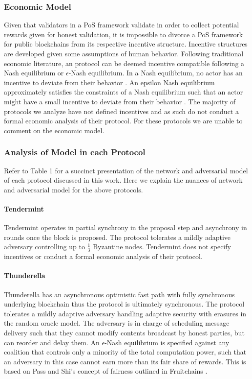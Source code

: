\documentclass[10pt,journal,compsoc]{IEEEtran}
\begin{document}
\subsubsection{Economic Model}
Given that validators in a PoS framework validate in order to collect potential rewards given for honest validation, it is impossible to divorce a PoS framework for public blockchains from its respective incentive structure. Incentive structures are developed given some assumptions of human behavior. Following traditional economic literature, an protocol can be deemed incentive compatible following a Nash equilibrium or $\epsilon$-Nash equilibrium. In a Nash equilibrium, no actor has an incentive to deviate from their behavior \cite{AlgoGT}. An epsilon Nash equilibrium approximately satisfies the constraints of a Nash equilibrium such that an actor might have a small incentive to deviate from their behavior \cite{PapaD}. The majority of protocols we analyze have not defined incentives and as such do not conduct a formal economic analysis of their protocol. For these protocols we are unable to comment on the economic model.

\subsubsection{Analysis of Model in each Protocol}
Refer to Table 1 for a succinct presentation of the network and adversarial model of each protocol discussed in this work. Here we explain the nuances of network and adversarial model for the above protocols.
\paragraph{Tendermint} Tendermint operates in partial synchrony in the proposal step and asynchrony in rounds once the block is proposed. The protocol tolerates a mildly adaptive adversary controlling up to \(\frac{1}{3}\) Byzantine nodes. Tendermint does not specify incentives or conduct a formal economic analysis of their protocol. 
\paragraph{Thunderella} Thunderella has an asynchronous optimistic fast path with fully synchronous underlying blockchain thus the protocol is ultimately synchronous. The protocol tolerates a mildly adaptive adversary handling adaptive security with erasures in the random oracle model. The adversary is in charge of scheduling message delivery such that they cannot modify contents broadcast by honest parties, but can reorder and delay them. An $\epsilon$-Nash equilibrium is specified against any coalition that controls only a minority of the total computation power, such that an adversary in this case cannot earn more than its fair share of rewards. This is based on Pass and Shi's concept of fairness outlined in Fruitchains \cite{fruitchains}.
\end{document}
